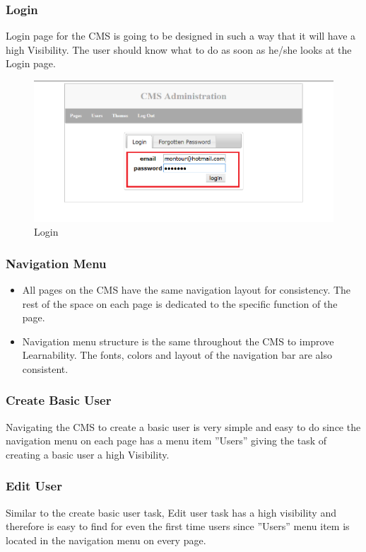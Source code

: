 \documentclass[12pt]{article}
\begin{document}
\subsubsection{Login}
Login page for the CMS is going to be designed in such a way that it will have a high Visibility. The user should know what to do as soon as he/she looks at the Login page.

\begin{figure}[H]
 \centering
    \includegraphics[width=\textwidth,height=\textheight,keepaspectratio]{pics/emailPassword.png}
    \caption{Login}
\end{figure}


\subsubsection{Navigation Menu}

\begin{itemize}
  \item All pages on the CMS have the same navigation layout for consistency. The rest of the space on each page is dedicated to the specific function of the page.
  \item Navigation menu structure is the same throughout the CMS to improve Learnability. The fonts, colors and layout of the navigation bar are also consistent.
\end{itemize}

\subsubsection{Create Basic User}
Navigating the CMS to create a basic user is very simple and easy to do since the navigation menu on each page has a menu item ''Users'' giving the task of creating a basic user a high Visibility.

\subsubsection{Edit User}
Similar to the create basic user task, Edit user task has a high visibility and therefore is easy to find for even the first time users since ''Users'' menu item is located in the navigation menu on every page.
\end{document}
